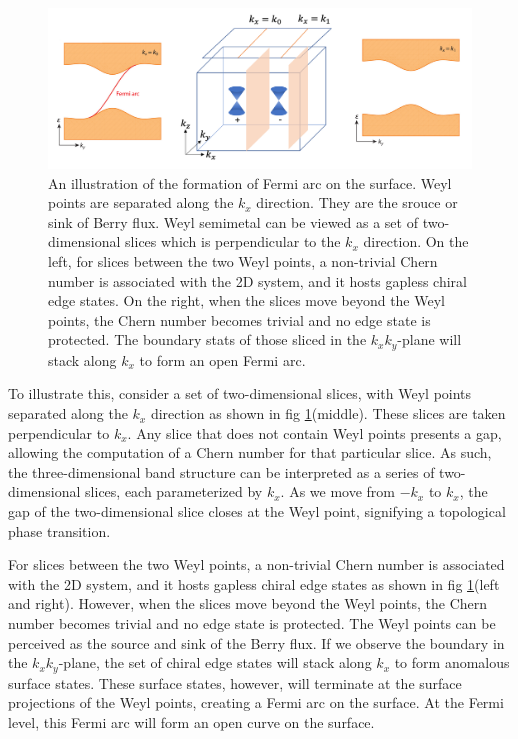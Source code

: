  \begin{figure}[h]
    \centering
    \includegraphics[width =\textwidth]{images/fermiarc.png}
    \caption{ An illustration of the formation of Fermi arc on the surface. Weyl points are separated along the $k_x$ direction. They are the srouce or sink of Berry flux. Weyl semimetal can be viewed as a set of two-dimensional slices which is perpendicular to the $k_x$ direction. On the left, for slices between the two Weyl points, a non-trivial Chern number is associated with the 2D system, and it hosts gapless chiral edge states. On the right, when the slices move beyond the Weyl points, the Chern number becomes trivial and no edge state is protected. The boundary stats of those sliced in the $k_xk_y$-plane  will stack along $k_x$ to form an open Fermi arc.
    }
    \label{fig:fermiarc}
\end{figure}
To illustrate this, consider a set of two-dimensional slices, with Weyl points separated along the $k_x$ direction as shown in fig \ref{fig:fermiarc}(middle). These slices are taken perpendicular to $k_x$. Any slice that does not contain Weyl points presents a gap, allowing the computation of a Chern number for that particular slice. As such, the three-dimensional band structure can be interpreted as a series of two-dimensional slices, each parameterized by $k_x$. As we move from $-k_x$ to $k_x$, the gap of the two-dimensional slice closes at the Weyl point, signifying a topological phase transition.

For slices between the two Weyl points, a non-trivial Chern number is associated with the 2D system, and it hosts gapless chiral edge states as shown in fig \ref{fig:fermiarc}(left and right). However, when the slices move beyond the Weyl points, the Chern number becomes trivial and no edge state is protected. The Weyl points can be perceived as the source and sink of the Berry flux. If we observe the boundary in the $k_xk_y$-plane, the set of chiral edge states will stack along $k_x$ to form anomalous surface states. These surface states, however, will terminate at the surface projections of the Weyl points, creating a Fermi arc on the surface. At the Fermi level, this Fermi arc will form an open curve on the surface.


